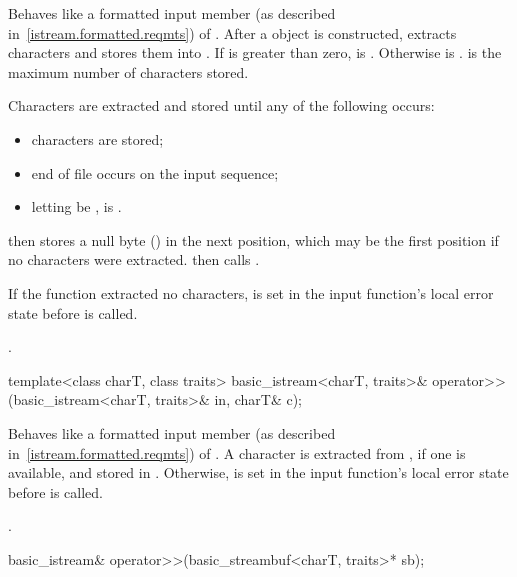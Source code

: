 \begin{itemdescr}
\pnum
\effects
Behaves like a formatted input member (as described in~\ref{istream.formatted.reqmts})
of .
After a
object is constructed,
extracts characters and stores them into
.
If
is greater than zero,  is
.
Otherwise  is .
 is the maximum number of characters stored.

\pnum
Characters are extracted and stored until any of the following occurs:
\begin{itemize}
\item {} characters are stored;
\item end of file occurs on the input sequence;
\item letting  be ,
 is .
\end{itemize}

\pnum
{}
then stores a null byte
()
in the next position, which may be the first position if no characters
were extracted.
then calls
.

\pnum
If the function extracted no characters,
 is set in the input function's local error state
before  is called.

\pnum
\returns
{}.
\end{itemdescr}

%
\begin{itemdecl}
template<class charT, class traits>
  basic_istream<charT, traits>& operator>>(basic_istream<charT, traits>& in, charT& c);
\end{itemdecl}

\begin{itemdescr}
\pnum
\effects
Behaves like a formatted input member (as described in~\ref{istream.formatted.reqmts})
of .
A character is extracted from , if one is available, and stored in .
Otherwise,
 is set in the input function's local error state
before  is called.

\pnum
\returns
{}.
\end{itemdescr}

%
\begin{itemdecl}
basic_istream& operator>>(basic_streambuf<charT, traits>* sb);
\end{itemdecl}

